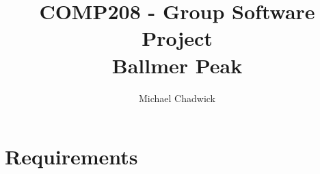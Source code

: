 \documentclass[openany,a4paper,12pt]{book}
\title{COMP208 - Group Software Project\\Ballmer Peak}
\author{Michael Chadwick}
\begin{document}
\maketitle
\tableofcontents

\part{Requirements}


%


%


%
%
%
%
%
%
%
%

\printbibliography
\end{document}

